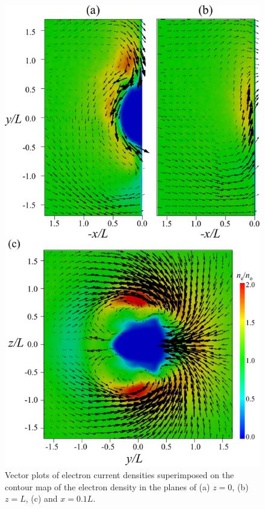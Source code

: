 \documentclass[draft,jgrga]{agutex2015}
\begin{document}
\begin{article}
\begin{figure}[h]
\centering
\noindent\includegraphics[width=12cm]{./figures/Fig_6_bb-crop.pdf}
\caption{Vector plots of electron current densities superimposed on the contour map 
of the electron density in the planes of (a) $z=0$, (b) $z=L$, (c) and $x=0.1L$.}\label{fig:6}
\end{figure}


\end{article}
\end{document}
